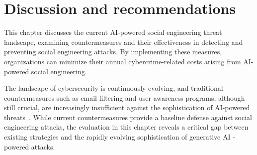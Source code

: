 

\chapter{Discussion and recommendations\label{chapter:discussion}}
\begin{comment}
- viimeisteltyä kirjakieltä, ei alan slangia. "does not", ei "doesn't"
- tietoturvakoulutus työajalla, EI omalla ajalla
- armeijassa saa vapaata hyvästä suorituksesta ammunnoissa. joku bonus gamifikaation kautta?
- employees can work from home, mention this? extra challenges for cybersecurity
- oman tietoturvatiimin tekemänä tai kolmannen osapuolen palveluna
- post-its and posters will likely be tuned out by the brain eventually. thus they must be kept fresh. luckily DALL-E can easily create such content, as often as needed
- orvot aliluvut merkki jäsentelyongelmasta, orvot luvunalotusrivit pakotetaan muun tekstin kanssa samalle sivulle
- muistuttamalla tärkeimmistä havainnoista luvun lopussa tavoitteeseen suhteutettuna
- Teknisten johtopäätösten tuoma impakti
- muistuttaa mieleen tutkimuskysymyksen, mainitsee tärkeimmät tulokset ja niiden perusteet
- keskittyy impaktiin ja esimerkiksi suosituksiin.
- ei pelkästään summeeraa luku kerrallaan aiempaa tekstiä
- As AI is developed further and the more its availability increases, the risk of malicious or criminal use increases as well
\end{comment}

This chapter discusses the current AI-powered social engineering threat landscape, examining countermeasures and their effectiveness in detecting and preventing social engineering attacks. By implementing these measures, organizations can minimize their annual cybercrime-related costs arising from AI-powered social engineering.



The landscape of cybersecurity is continuously evolving, and traditional countermeasures such as email filtering and user awareness programs, although still crucial, are increasingly insufficient against the sophistication of AI-powered threats~\citep{fakhouri_AI_Driven_Solutions_SE_Attacks_2024}. While current countermeasures provide a baseline defense against social engineering attacks, the evaluation in this chapter reveals a critical gap between existing strategies and the rapidly evolving sophistication of generative AI -powered attacks. 


